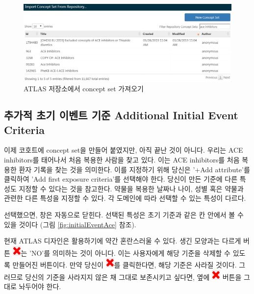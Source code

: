 \documentclass[10.5pt]{book}
\theoremstyle{definition}
\theoremstyle{definition}
\theoremstyle{definition}
\theoremstyle{remark}
\let\BeginKnitrBlock\begin \let\EndKnitrBlock\end
\begin{document}
\begin{figure}

{\centering \includegraphics[width=1\linewidth]{images/Cohorts/ATLAS-findingyourconcept} 

}

\caption{ATLAS 저장소에서 concept set 가져오기}\label{fig:ATLASfindyourconcept}
\end{figure}

\subsection{추가적 초기 이벤트 기준 Additional Initial Event
Criteria}\label{----additional-initial-event-criteria}

이제 코호트에 concept set을 만들어 붙였지만, 아직 끝난 것이 아니다.
우리는 ACE inhibitors를 태어나서 처음 복용한 사람을 찾고 있다. 이는 ACE
inhibitors를 처음 복용한 환자 기록을 찾는 것을 의미한다. 이를 지정하기
위해 당신은 '+Add attribute'를 클릭하여 'Add first exposure criteria'를
선택해야 한다. 당신이 만든 기준에 다른 특성도 지정할 수 있다는 것을
참고한다. 약물을 복용한 날짜나 나이, 성별 혹은 약물과 관련한 다른 특성을
지정할 수 있다. 각 도메인에 따라 선택할 수 있는 특성이 다르다.

선택했으면, 창은 자동으로 닫힌다. 선택된 특성은 초기 기준과 같은 칸
안에서 볼 수 있을 것이다 (그림 \ref{fig:initialEventAce} 참조).

\BeginKnitrBlock{rmdimportant}
현재 ATLAS 디자인은 활용하기에 약간 혼란스러울 수 있다. 생긴 모양과는
다르게 버튼 \includegraphics{images/Cohorts/redX.png}는 'NO'를 의미하는
것이 아니다. 이는 사용자에게 해당 기준을 삭제할 수 있도록 만들어진
버튼이다. 만약 당신이 \includegraphics{images/Cohorts/redX.png}를
클릭한다면, 해당 기준은 사라질 것이다. 그러므로 당신의 기준을 사라지지
않은 채 그대로 보존시키고 싶다면, 옆에
\includegraphics{images/Cohorts/redX.png} 버튼을 그대로 놔두어야 한다.
\EndKnitrBlock{rmdimportant}
\end{document}
